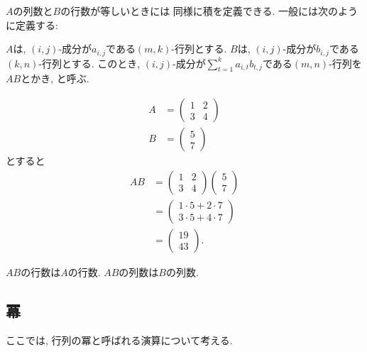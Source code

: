 $A$の列数と$B$の行数が等しいときには
同様に積を定義できる.
一般には次のように定義する:
\begin{definition}
  \label{def:op:prod}
  $A$は, $(i,j)$-成分が$a_{i,j}$である$(m,k)$-行列とする.
  $B$は, $(i,j)$-成分が$b_{i,j}$である$(k,n)$-行列とする.
  このとき,
  $(i,j)$-成分が$\sum_{t=1}^{k}a_{i,t}b_{t,j}$である$(m,n)$-行列を$AB$とかき,
  と呼ぶ. 
\end{definition}
\begin{example}
  \begin{align*}
    A&=\begin{pmatrix}1&2\\3&4\end{pmatrix}\\
    B&=\begin{pmatrix}5\\7\end{pmatrix}
  \end{align*}
  とすると
  \begin{align*}
    AB&=\begin{pmatrix}1&2\\3&4\end{pmatrix}\begin{pmatrix}5\\7\end{pmatrix}\\
      &=\begin{pmatrix}1\cdot 5+2\cdot 7\\
      3\cdot 5+4\cdot 7\end{pmatrix}\\
      &=\begin{pmatrix}19\\43\end{pmatrix}.
  \end{align*}
\end{example}

\begin{remark}
  $AB$の行数は$A$の行数.
  $AB$の列数は$B$の列数.
\end{remark}

\subsection{冪}
ここでは, 行列の冪と呼ばれる演算について考える.


